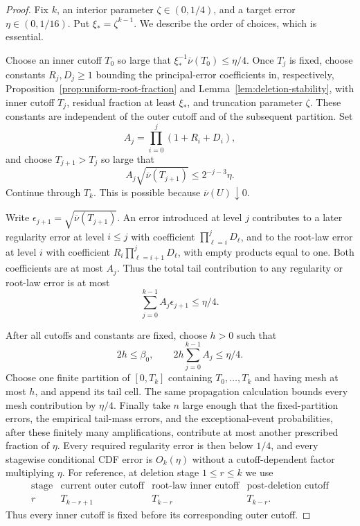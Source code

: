 \documentclass[11pt]{article}
\theoremstyle{definition}
\theoremstyle{remark}
\begin{document}
\begin{proof}
Fix $k$, an interior parameter $\zeta\in(0,1/4)$, and a target error
$\eta\in(0,1/16)$.  Put $\xi_*=\zeta^{k-1}$.  We describe the order of
choices, which is essential.

Choose an inner cutoff $T_0$ so large that
$\xi_*^{-1}\overline\nu(T_0)\le\eta/4$.  Once $T_j$ is fixed, choose
constants $R_j,D_j\ge1$ bounding the principal-error coefficients in,
respectively, Proposition~\ref{prop:uniform-root-fraction} and
Lemma~\ref{lem:deletion-stability}, with inner cutoff $T_j$, residual fraction
at least $\xi_*$, and truncation parameter $\zeta$.  These constants are
independent of the outer cutoff and of the subsequent partition.  Set
\[
 A_j=\prod_{i=0}^{j}(1+R_i+D_i),
\]
and choose $T_{j+1}>T_j$ so large that
\[
 A_j\sqrt{\overline\nu(T_{j+1})}\le2^{-j-3}\eta.
\]
Continue through $T_k$.  This is possible because
$\overline\nu(U)\downarrow0$.

Write $\epsilon_{j+1}=\sqrt{\overline\nu(T_{j+1})}$.  An error introduced at
level $j$ contributes to a later regularity error at level $i\le j$ with
coefficient $\prod_{\ell=i}^jD_\ell$, and to the root-law error at level $i$
with coefficient $R_i\prod_{\ell=i+1}^jD_\ell$, with empty products equal to
one.  Both coefficients are at most $A_j$.  Thus the total tail contribution
to any regularity or root-law error is at most
\[
 \sum_{j=0}^{k-1}A_j\epsilon_{j+1}\le\eta/4.
\]

After all cutoffs and constants are fixed, choose $h>0$ such that
\[
 2h\le\beta_0,
 \qquad
 2h\sum_{j=0}^{k-1}A_j\le\eta/4.
\]
Choose one finite partition of $[0,T_k]$ containing $T_0,\ldots,T_k$ and
having mesh at most $h$, and append its tail cell.  The same propagation
calculation bounds every mesh contribution by $\eta/4$.  Finally take $n$
large enough that the fixed-partition errors, the empirical tail-mass errors,
and the exceptional-event probabilities, after these finitely many
amplifications, contribute at most another prescribed fraction of $\eta$.
Every required regularity error is then below $1/4$, and every stagewise
conditional CDF error is $O_k(\eta)$ without a cutoff-dependent factor
multiplying $\eta$.  For reference, at deletion stage $1\le r\le k$ we use
\[
\begin{array}{c|c|c|c}
\text{stage}&\text{current outer cutoff}&\text{root-law inner cutoff}
&\text{post-deletion cutoff}\\ \hline
r&T_{k-r+1}&T_{k-r}&T_{k-r}.
\end{array}
\]
Thus every inner cutoff is fixed before its corresponding outer cutoff.


\end{proof}
\end{document}
